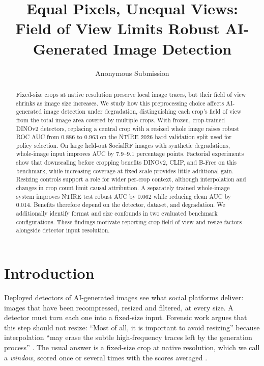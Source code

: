 \documentclass[letterpaper]{article} %
\title{Equal Pixels, Unequal Views:\\Field of View Limits Robust AI-Generated Image Detection}
\author{Anonymous Submission}
\begin{document}
\maketitle

\begin{abstract}
Fixed-size crops at native resolution preserve local image traces, but their
field of view shrinks as image size increases. We study how this
preprocessing choice affects AI-generated image detection under degradation,
distinguishing each crop's field of view from the total image area covered
by multiple crops. With frozen, crop-trained DINOv2 detectors, replacing a
central crop with a resized whole image raises robust ROC AUC from 0.886 to
0.963 on the NTIRE 2026 hard validation split used for policy selection. On
large held-out SocialRF images with synthetic degradations, whole-image
input improves AUC by 7.9--9.1 percentage points. Factorial experiments show
that downscaling before cropping benefits DINOv2, CLIP, and B-Free on this
benchmark, while increasing coverage at fixed scale provides little
additional gain. Resizing controls support a role for wider per-crop context,
although interpolation and changes in crop count limit causal attribution.
A separately trained whole-image system improves NTIRE test robust AUC by
0.062 while reducing clean AUC by 0.014. Benefits therefore depend on the
detector, dataset, and degradation. We additionally identify format and size
confounds in two evaluated benchmark configurations. These findings motivate
reporting crop field of view and resize factors alongside detector input
resolution.
\end{abstract}

\section{Introduction}
\label{sec:intro}

Deployed detectors of AI-generated images see what social platforms deliver:
images that have been recompressed, resized and filtered, at every size. A
detector must turn each one into a fixed-size input. Forensic work argues
that this step should not resize: ``Most of all, it is important
to avoid resizing'' because interpolation ``may erase the subtle
high-frequency traces left by the generation process''
\cite{corvi2023detection}. The usual answer is a fixed-size crop at native
resolution, which we call a \emph{window}, scored once or several times with
the scores averaged
\cite{corvi2023detection,li2025safe,guillaro2025bfree,konstantinidou2025texturecrop}.
\end{document}
